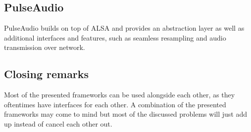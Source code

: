 \subsection{PulseAudio}

PulseAudio builds on top of ALSA and provides an abstraction layer as well as additional interfaces and features, such as seamless resampling and audio transmission over network.

\subsection{Closing remarks}
Most of the presented frameworks can be used alongside each other, as they oftentimes have interfaces for each other. 
A combination of the presented frameworks may come to mind but most of the discussed problems will just add up instead of cancel each other out.
